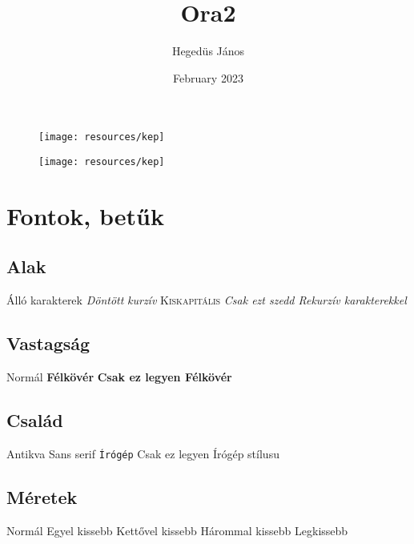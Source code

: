 \documentclass{article}
\title{Ora2}
\author{Hegedüs János}
\date{February 2023}
\begin{document}
    \maketitle
    \blindtext[4]
    \begin{figure}[h]
        \centering
        \texttt{[image: resources/kep]}
    \end{figure}
    \begin{figure}[p]
        \centering
        \texttt{[image: resources/kep]}
    \end{figure}
    \blindtext[5]
    \section{Fontok, betűk}
        \subsection{Alak}
            \textup{Álló karakterek} %
            \textsl{Döntött} %
            \textit{kurzív}  %
            \textsc{Kiskapitális} %
            {
                \itshape
                Csak ezt szedd Rekurzív karakterekkel
            }

        \subsection{Vastagság}
            \textmd{Normál} %
            \textbf{Félkövér} %
            {
                \bfseries
                Csak ez legyen Félkövér
            }
        \subsection{Család}
            \textrm{Antikva} %
            \textsf{Sans serif} %
            \texttt{Írógép} %
            {
                \ttfamily
                Csak ez legyen Írógép stílusu
            }
        \subsection{Méretek}
            \normalsize Normál
            \small Egyel kissebb
            \footnotesize Kettővel kissebb
            \scriptsize Hárommal kissebb
            \tiny Legkissebb
\end{document}
